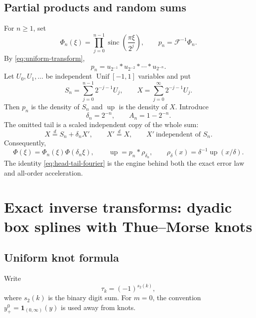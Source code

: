 \documentclass[11pt]{article}
\theoremstyle{definition}
\theoremstyle{remark}
\newcommand{\Up}{\operatorname{up}}
\newcommand{\sinc}{\operatorname{sinc}}
\newcommand{\Fourier}{\mathcal F}
\begin{document}
\subsection{Partial products and random sums}

For $n\ge1$, set
\begin{equation}
 \Phi_n(\xi)=\prod_{j=0}^{n-1}\sinc\!\left(\frac{\pi\xi}{2^j}\right),
 \qquad p_n=\Fourier^{-1}\Phi_n.
 \label{eq:prefix-product}
\end{equation}
By \cref{eq:uniform-transform},
\begin{equation}
 p_n=u_{2^{-1}}*u_{2^{-2}}*\cdots*u_{2^{-n}}.
 \label{eq:prefix-convolution}
\end{equation}
Let $U_0,U_1,\ldots$ be independent $\operatorname{Unif}[-1,1]$ variables and put
\begin{equation}
 S_n=\sum_{j=0}^{n-1}2^{-j-1}U_j,
 \qquad
 X=\sum_{j=0}^{\infty}2^{-j-1}U_j.
 \label{eq:random-sums}
\end{equation}
Then $p_n$ is the density of $S_n$ and $\Up$ is the density of $X$.
Introduce
\begin{equation}
 \delta_n=2^{-n},\qquad A_n=1-2^{-n}.
 \label{eq:delta-A}
\end{equation}
The omitted tail is a scaled independent copy of the whole sum:
\begin{equation}
 X\overset d=S_n+\delta_nX',
 \qquad X'\overset d=X,
 \qquad X'\ \text{independent of }S_n.
 \label{eq:head-tail-random}
\end{equation}
Consequently,
\begin{equation}
 \Phi(\xi)=\Phi_n(\xi)\Phi(\delta_n\xi),
 \qquad
 \Up=p_n*\rho_{\delta_n},
 \qquad
 \rho_\delta(x)=\delta^{-1}\Up(x/\delta).
 \label{eq:head-tail-fourier}
\end{equation}
The identity \cref{eq:head-tail-fourier} is the engine behind both the exact error law
and all-order acceleration.

\section{Exact inverse transforms: dyadic box splines with Thue--Morse knots}
\label{sec:exact-spline}

\subsection{Uniform knot formula}

Write
\begin{equation}
 \tau_k=(-1)^{s_2(k)},
 \label{eq:tm-sign}
\end{equation}
where $s_2(k)$ is the binary digit sum.  For $m=0$, the convention
$y_+^0=\mathbf 1_{(0,\infty)}(y)$ is used away from knots.
\end{document}
